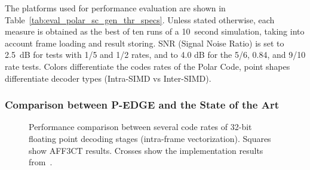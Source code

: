 The platforms used for performance evaluation are shown in
Table~\ref{tab:eval_polar_sc_gen_thr_specs}. Unless stated otherwise, each
measure is obtained as the best of ten runs of a 10~second simulation, taking
into account frame loading and result storing. SNR (Signal Noise Ratio) is set
to 2.5~dB for tests with 1/5 and 1/2 rates, and to 4.0 dB for the 5/6, 0.84, and
9/10 rate tests. Colors differentiate the codes rates of the Polar Code, point
shapes differentiate decoder types (Intra-SIMD vs Inter-SIMD).

\subsubsection{Comparison between P-EDGE and the State of the Art}

\begin{figure}[htp]
  \centering
  \quad
  \caption{Performance comparison between several code rates of 32-bit floating
    point decoding stages (intra-frame vectorization). Squares show AFF3CT
    results. Crosses show the implementation results from~\cite{Sarkis2014}.}
  \label{plot:eval_polar_sc_gen_thr_intra}
\end{figure}

